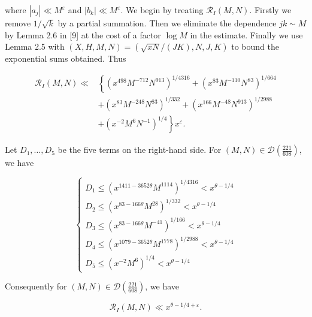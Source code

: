 \documentclass[10pt]{article}
\begin{document}
where $\left|a_{j}\right| \ll M^{\varepsilon}$ and $\left|b_{k}\right| \ll M^{\varepsilon}$.
We begin by treating $\mathscr R_I(M,N)$. Firstly we remove $1 / \sqrt{k}$ by a partial summation. Then we eliminate the dependence $j k \sim M$ by Lemma 2.6 in [9] at the cost of a factor $\log M$ in the estimate. Finally we use Lemma 2.5 with $(X,H,M,N)=(\sqrt{xN}/(JK),N,J,K)$ to bound the exponential sums obtained. Thus

$$
\begin{aligned}
\mathscr R_I(M,N) \ll & \left\{\left(x^{498} M^{-712} N^{913}\right)^{1 / 4316}+\left(x^{83} M^{-110} N^{83}\right)^{1 / 664}\right. \\
& +\left(x^{83} M^{-248} N^{83}\right)^{1 / 332}+\left(x^{166} M^{-48} N^{913}\right)^{1 / 2988} \\
& \left.+\left(x^{-2} M^{6} N^{-1}\right)^{1 / 4}\right\} x^{\varepsilon} .
\end{aligned}
$$

Let $D_{1}, \ldots, D_{5}$ be the five terms on the right-hand side. For $(M, N) \in \mathscr{D}\left(\frac{221}{608}\right)$, we have

$$
\left\{\begin{array}{l}
D_{1} \leqslant\left(x^{1411-3652 \theta} M^{1114}\right)^{1 / 4316}<x^{\theta-1 / 4} \\
D_{2} \leqslant\left(x^{83-166 \theta} M^{28}\right)^{1 / 332}<x^{\theta-1 / 4} \\
D_{3} \leqslant\left(x^{83-166 \theta} M^{-41}\right)^{1 / 166}<x^{\theta-1 / 4} \\
D_{4} \leqslant\left(x^{1079-3652 \theta} M^{1778}\right)^{1 / 2988}<x^{\theta-1 / 4} \\
D_{5} \leqslant\left(x^{-2} M^{6}\right)^{1 / 4}<x^{\theta-1 / 4}
\end{array}\right.
$$

Consequently for $(M, N) \in \mathscr{D}\left(\frac{221}{608}\right)$, we have


\begin{equation*}
\mathscr R_I(M,N) \ll x^{\theta-1 / 4+\varepsilon} . \tag{4.2}
\end{equation*}
\end{document}
